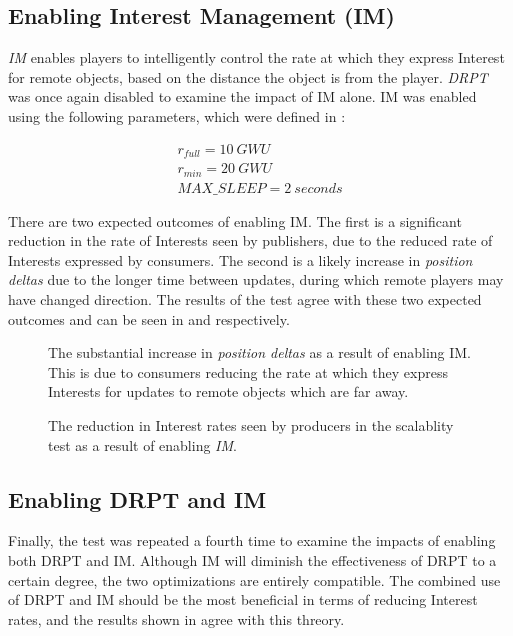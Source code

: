 \subsection{Enabling Interest Management (IM)}
\textit{IM} enables players to intelligently control the rate at which they express Interest for remote objects, based on the distance the object is from the player. \textit{DRPT} was once again disabled to examine the impact of IM alone. IM was enabled using the following parameters, which were defined in :

\begin{gather*}
    r_{full} = 10\ GWU\\
    r_{min} = 20\ GWU\\
    MAX\_SLEEP = 2\ seconds
\end{gather*}

There are two expected outcomes of enabling IM. The first is a significant reduction in the rate of Interests seen by publishers, due to the reduced rate of Interests expressed by consumers. The second is a likely increase in \textit{position deltas} due to the longer time between updates, during which remote players may have changed direction. The results of the test agree with these two expected outcomes and can be seen in  and  respectively.

\begin{figure}[H]
    \centering
    \caption{The substantial increase in \textit{position deltas} as a result of enabling IM. This is due to consumers reducing the rate at which they express Interests for updates to remote objects which are far away. }
    \label{fig:eval:im:pos-deltas}
\end{figure}


\begin{figure}[H]
    \centering
    \caption{The reduction in Interest rates seen by producers in the scalablity test as a result of enabling \textit{IM}.}
    \label{fig:eval:im:interest-impacts}
\end{figure}

\subsection{Enabling DRPT and IM}
Finally, the test was repeated a fourth time to examine the impacts of enabling both DRPT and IM. Although IM will diminish the effectiveness of DRPT to a certain degree, the two optimizations are entirely compatible. The combined use of DRPT and IM should be the most beneficial in terms of reducing Interest rates, and the results shown in  agree with this threory. 

